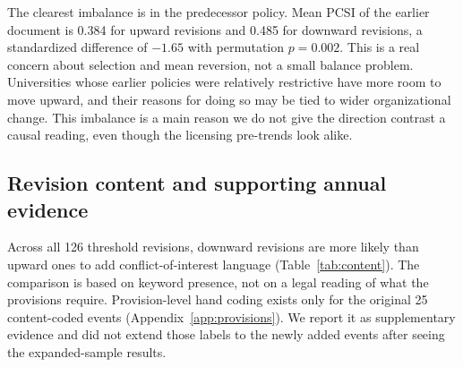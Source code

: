 The clearest imbalance is in the predecessor policy. Mean PCSI of the earlier document is 0.384 for upward revisions and 0.485 for downward revisions, a standardized difference of $-1.65$ with permutation $p=0.002$. This is a real concern about selection and mean reversion, not a small balance problem. Universities whose earlier policies were relatively restrictive have more room to move upward, and their reasons for doing so may be tied to wider organizational change. This imbalance is a main reason we do not give the direction contrast a causal reading, even though the licensing pre-trends look alike.

\subsection*{Revision content and supporting annual evidence}

Across all 126 threshold revisions, downward revisions are more likely than upward ones to add conflict-of-interest language (Table~\ref{tab:content}). The comparison is based on keyword presence, not on a legal reading of what the provisions require. Provision-level hand coding exists only for the original 25 content-coded events (Appendix~\ref{app:provisions}). We report it as supplementary evidence and did not extend those labels to the newly added events after seeing the expanded-sample results.


